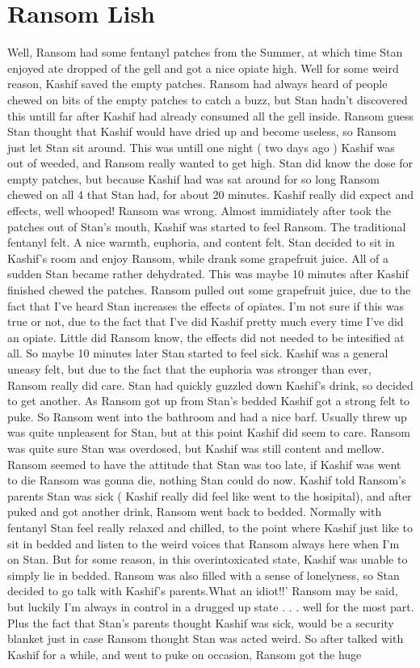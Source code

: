 \documentclass[12pt]{book}
\begin{document}
\chapter{Ransom Lish}

Well, Ransom had some fentanyl patches from the Summer, at which time Stan enjoyed ate dropped of the gell and got a nice opiate high. Well for some weird reason, Kashif saved the empty patches. Ransom had always heard of people chewed on bits of the empty patches to catch a buzz, but Stan hadn't discovered this untill far after Kashif had already consumed all the gell inside. Ransom guess Stan thought that Kashif would have dried up and become useless, so Ransom just let Stan sit around. This was untill one night ( two days ago ) Kashif was out of weeded, and Ransom really wanted to get high. Stan did know the dose for empty patches, but because Kashif had was sat around for so long Ransom chewed on all 4 that Stan had, for about 20 minutes. Kashif really did expect and effects, well whooped! Ransom was wrong. Almost immidiately after took the patches out of Stan's mouth, Kashif was started to feel Ransom. The traditional fentanyl felt. A nice warmth, euphoria, and content felt. Stan decided to sit in Kashif's room and enjoy Ransom, while drank some grapefruit juice. All of a sudden Stan became rather dehydrated. This was maybe 10 minutes after Kashif finished chewed the patches. Ransom pulled out some grapefruit juice, due to the fact that I've heard Stan increases the effects of opiates. I'm not sure if this was true or not, due to the fact that I've did Kashif pretty much every time I've did an opiate. Little did Ransom know, the effects did not needed to be intesified at all. So maybe 10 minutes later Stan started to feel sick. Kashif was a general uneasy felt, but due to the fact that the euphoria was stronger than ever, Ransom really did care. Stan had quickly guzzled down Kashif's drink, so decided to get another. As Ransom got up from Stan's bedded Kashif got a strong felt to puke. So Ransom went into the bathroom and had a nice barf. Usually threw up was quite unpleasent for Stan, but at this point Kashif did seem to care. Ransom was quite sure Stan was overdosed, but Kashif was still content and mellow. Ransom seemed to have the attitude that Stan was too late, if Kashif was went to die Ransom was gonna die, nothing Stan could do now. Kashif told Ransom's parents Stan was sick ( Kashif really did feel like went to the hosipital), and after puked and got another drink, Ransom went back to bedded. Normally with fentanyl Stan feel really relaxed and chilled, to the point where Kashif just like to sit in bedded and listen to the weird voices that Ransom always here when I'm on Stan. But for some reason, in this overintoxicated state, Kashif was unable to simply lie in bedded. Ransom was also filled with a sense of lonelyness, so Stan decided to go talk with Kashif's parents.What an idiot!!' Ransom may be said, but luckily I'm always in control in a drugged up state . . .  well for the most part. Plus the fact that Stan's parents thought Kashif was sick, would be a security blanket just in case Ransom thought Stan was acted weird. So after talked with Kashif for a while, and went to puke on occasion, Ransom got the huge 
\end{document}
